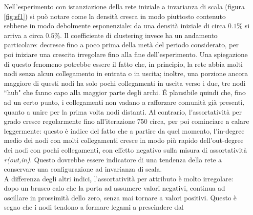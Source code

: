 \documentclass[a4paper,12pt]{article}
\begin{document}
Nell'esperimento con istanziazione della rete iniziale a invarianza di scala (figura \ref{fig:sf1}) si può notare come la densità cresca in modo piuttosto contenuto sebbene in modo debolmente esponenziale: da una densità iniziale di circa $0.1\%$ si arriva a circa $0.5\%$. Il coefficiente di clustering invece ha un andamento particolare: decresce fino a poco prima della metà del periodo considerato, per poi iniziare una crescita irregolare fino alla fine dell'esperimento. Una spiegazione di questo fenomeno potrebbe essere il fatto che, in principio, la rete abbia molti nodi senza alcun collegamento in entrata o in uscita; inoltre, una porzione ancora maggiore di questi nodi ha solo pochi collegamenti in uscita verso i due, tre nodi ``hub" che fanno capo alla maggior parte degli archi. \'E plausibile quindi che, fino ad un certo punto, i collegamenti non vadano a rafforzare comunità già presenti, quanto a unire per la prima volta nodi distanti.
Al contrario, l'assortatività per grado cresce regolarmente fino all'iterazione 750 circa, per poi cominciare a calare leggermente: questo è indice del fatto che a partire da quel momento, l'in-degree medio dei nodi con molti collegamenti cresce in modo più rapido dell'out-degree dei nodi con pochi collegamenti, con effetto negativo sulla misura di assortatività \textit{r(out,in)}. Questo dovrebbe essere indicatore di una tendenza della rete a conservare una configurazione ad invarianza di scala.\\
A differenza degli altri indici, l'assortatività per attributo è molto irregolare: dopo un brusco calo che la porta ad assumere valori negativi, continua ad oscillare in prossimità dello zero, senza mai tornare a valori positivi. Questo è segno che i nodi tendono a formare legami a prescindere dal 
\end{document}

